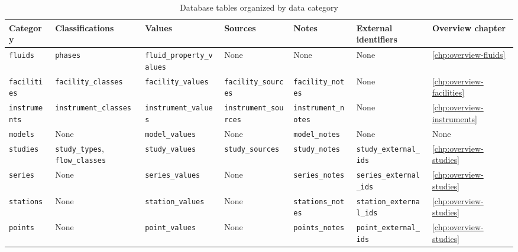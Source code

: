 \begin{landscape}
\begin{table}[p]
    \centering
    \scriptsize
    \begin{tabular}{ l | l l l l l l }
        Category              & Classifications                              & Values                           & Sources                      & Notes                      & External identifiers            & Overview chapter \\
        \hline
        \texttt{fluids}      & \texttt{phases}                               & \texttt{fluid\_property\_values} & None                         & None                       & None                            & \ref{chp:overview-fluids} \\
        \texttt{facilities}  & \texttt{facility\_classes}                    & \texttt{facility\_values}        & \texttt{facility\_sources}   & \texttt{facility\_notes}   & None                            & \ref{chp:overview-facilities} \\
        \texttt{instruments} & \texttt{instrument\_classes}                  & \texttt{instrument\_values}      & \texttt{instrument\_sources} & \texttt{instrument\_notes} & None                            & \ref{chp:overview-instruments} \\
        \texttt{models}      & None                                          & \texttt{model\_values}           & None                         & \texttt{model\_notes}      & None                            & None \\
        \texttt{studies}     & \texttt{study\_types}, \texttt{flow\_classes} & \texttt{study\_values}           & \texttt{study\_sources}      & \texttt{study\_notes}      & \texttt{study\_external\_ids}   & \ref{chp:overview-studies} \\
        \texttt{series}      & None                                          & \texttt{series\_values}          & None                         & \texttt{series\_notes}     & \texttt{series\_external\_ids}  & \ref{chp:overview-studies} \\
        \texttt{stations}    & None                                          & \texttt{station\_values}         & None                         & \texttt{stations\_notes}   & \texttt{station\_external\_ids} & \ref{chp:overview-studies} \\
        \texttt{points}      & None                                          & \texttt{point\_values}           & None                         & \texttt{points\_notes}     & \texttt{point\_external\_ids}   & \ref{chp:overview-studies}
    \end{tabular}
    \caption{Database tables organized by data category}
    \label{tab:database-tables}
\end{table}
\end{landscape}

